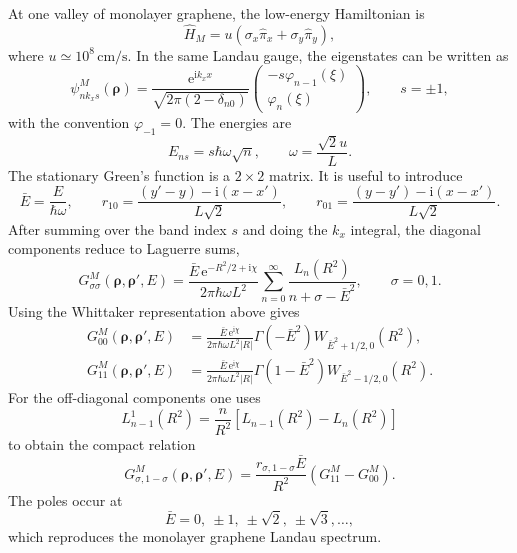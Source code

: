 \documentclass[11pt]{article}
\newcommand{\ii}{\mathrm i}
\newcommand{\ee}{\mathrm e}
\newcommand{\brho}{\bm{\rho}}
\begin{document}
At one valley of monolayer graphene, the low-energy Hamiltonian is
\begin{equation}
  \hat H_M=u(\sigma_x\hat\pi_x+\sigma_y\hat\pi_y),
\end{equation}
where \(u\simeq 10^8\,\mathrm{cm/s}\). In the same Landau gauge, the eigenstates can be written as
\begin{equation}
  \psi^M_{n k_x s}(\brho)=
  \frac{\ee^{\ii k_x x}}{\sqrt{2\pi(2-\delta_{n0})}}
  \begin{pmatrix}
    -s\varphi_{n-1}(\xi)\\
    \varphi_n(\xi)
  \end{pmatrix},
  \qquad s=\pm1,
\end{equation}
with the convention \(\varphi_{-1}=0\). The energies are
\begin{equation}
  E_{ns}=s\hbar\omega\sqrt n,
  \qquad \omega=\frac{\sqrt2 u}{L}.
\end{equation}
The stationary Green's function is a \(2\times2\) matrix. It is useful to introduce
\begin{equation}
  \bar E=\frac{E}{\hbar\omega}, \qquad
  r_{10}=\frac{(y'-y)-\ii(x-x')}{L\sqrt2}, \qquad
  r_{01}=\frac{(y-y')-\ii(x-x')}{L\sqrt2}.
\end{equation}
After summing over the band index \(s\) and doing the \(k_x\) integral, the diagonal components reduce to Laguerre sums,
\begin{equation}
  G^M_{\sigma\sigma}(\brho,\brho',E)=
  \frac{\bar E\,\ee^{-R^2/2+\ii\chi}}{2\pi\hbar\omega L^2}
  \sum_{n=0}^{\infty}\frac{L_n(R^2)}{n+\sigma-\bar E^2},
  \qquad \sigma=0,1 .
\end{equation}
Using the Whittaker representation above gives
\begin{align}
  \boxed{G^M_{00}(\brho,\brho',E)}
  &=\frac{\bar E\,\ee^{\ii\chi}}{2\pi\hbar\omega L^2|R|}
    \Gamma(-\bar E^2)
    W_{\bar E^2+1/2,0}(R^2),\\
  \boxed{G^M_{11}(\brho,\brho',E)}
  &=\frac{\bar E\,\ee^{\ii\chi}}{2\pi\hbar\omega L^2|R|}
    \Gamma(1-\bar E^2)
    W_{\bar E^2-1/2,0}(R^2).
\end{align}
For the off-diagonal components one uses
\begin{equation}
  L_{n-1}^{1}(R^2)=\frac{n}{R^2}\left[L_{n-1}(R^2)-L_n(R^2)\right]
\end{equation}
to obtain the compact relation
\begin{equation}
  \boxed{
  G^M_{\sigma,1-\sigma}(\brho,\brho',E)=
  \frac{r_{\sigma,1-\sigma}\bar E}{R^2}
  \left(G^M_{11}-G^M_{00}\right).}
\end{equation}
The poles occur at
\begin{equation}
  \bar E=0,\ \pm1,\ \pm\sqrt2,\ \pm\sqrt3,\ldots,
\end{equation}
which reproduces the monolayer graphene Landau spectrum.
\end{document}
